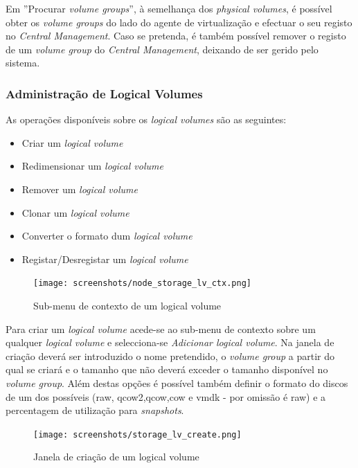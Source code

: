 Em ''Procurar \emph{volume groups}'', à semelhança dos \emph{physical volumes}, é possível obter os \emph{volume groups} do lado do agente de virtualização e efectuar o seu registo no \emph{Central Management}.
Caso se pretenda, é também possível remover o registo de um \emph{volume group} do \emph{Central Management}, deixando de ser gerido pelo sistema.


\subsubsection{Administração de Logical Volumes}

As operações disponíveis sobre os \emph{logical volumes} são as seguintes:
\begin{itemize}
	\item Criar um \emph{logical volume}
	\item Redimensionar um \emph{logical volume}
	\item Remover um \emph{logical volume}
	\item Clonar um \emph{logical volume}
	\item Converter o formato dum \emph{logical volume}
    \item Registar/Desregistar um \emph{logical volume}
\end{itemize}

\begin{figure}[H]
        \begin{center}
        \texttt{[image: screenshots/node\_storage\_lv\_ctx.png]}
        \caption{Sub-menu de contexto de um logical volume}
        \label{fig:storage_lv_ctx}
        \end{center}
\end{figure}

Para criar um \emph{logical volume} acede-se ao sub-menu de contexto sobre um qualquer \emph{logical volume} e selecciona-se \emph{Adicionar logical volume}.
Na janela de criação deverá ser introduzido o nome pretendido, o \emph{volume group} a partir do qual se criará e o tamanho que não deverá exceder o tamanho disponível no \emph{volume group}.
Além destas opções é possível também definir o formato do discos de um dos possíveis (raw, qcow2,qcow,cow e vmdk - por omissão é raw) e a percentagem de utilização para \emph{snapshots}.

\begin{figure}[H]
        \begin{center}
        \texttt{[image: screenshots/storage\_lv\_create.png]}
        \caption{Janela de criação de um logical volume}
        \label{fig:storage_lv_create}
        \end{center}
\end{figure}

